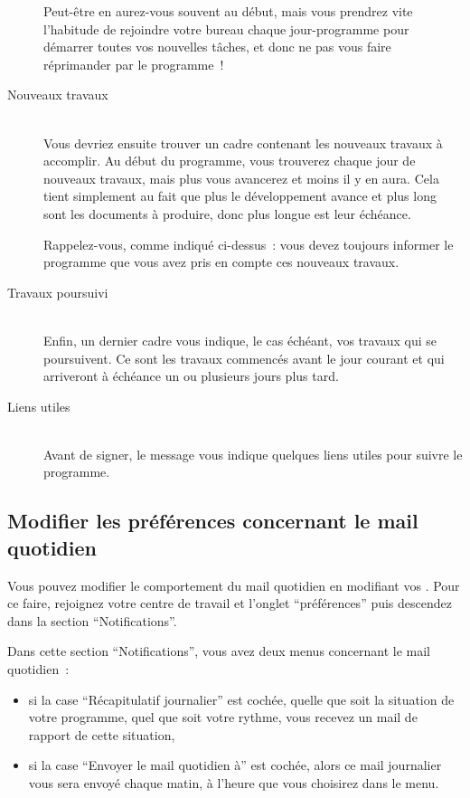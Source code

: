 \begin{description}
Peut-être en aurez-vous souvent au début, mais vous prendrez vite l'habitude de rejoindre votre bureau chaque jour-programme pour démarrer toutes vos nouvelles tâches, et donc ne pas vous faire réprimander par le programme~{}!



\item[Nouveaux travaux] \hfill \\
 Vous devriez ensuite trouver un cadre contenant les nouveaux travaux à accomplir. Au début du programme, vous trouverez chaque jour de nouveaux travaux, mais plus vous avancerez et moins il y en aura. Cela tient simplement au fait que plus le développement avance et plus long sont les documents à produire, donc plus longue est leur échéance.



Rappelez-vous, comme indiqué ci-dessus~{}: vous devez toujours informer le programme que vous avez pris en compte ces nouveaux travaux.



\item[Travaux poursuivi] \hfill \\
 Enfin, un dernier cadre vous indique, le cas échéant, vos travaux qui se poursuivent. Ce sont les travaux commencés avant le jour courant et qui arriveront  à échéance un ou plusieurs jours plus tard.



\item[Liens utiles] \hfill \\
 Avant de signer, le message vous indique quelques liens utiles pour suivre le programme.
\end{description}

\subsection{Modifier les préférences concernant le mail quotidien}\hypertarget{modifier-les-prfrences-concernant-le-mail-quotidien}{}\label{modifier-les-prfrences-concernant-le-mail-quotidien}

Vous pouvez modifier le comportement du mail quotidien en modifiant vos \preferences{}. Pour ce faire, rejoignez votre centre de travail et l'onglet \enquote{préférences} puis descendez dans la section \enquote{Notifications}.

Dans cette section \enquote{Notifications}, vous avez deux menus concernant le mail quotidien~{}:

\begin{itemize}
\item si la case \enquote{Récapitulatif journalier} est cochée, quelle que soit la situation de votre programme, quel que soit votre rythme, vous recevez un mail de rapport de cette situation,
\item si la case \enquote{Envoyer le mail quotidien à} est cochée, alors ce mail journalier vous sera envoyé chaque matin, à l'heure que vous choisirez dans le menu.
\end{itemize}
